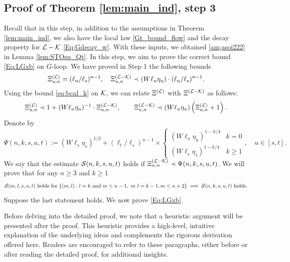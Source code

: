 \documentclass[10pt,reqno]{article}
\theoremstyle{plain} %
\theoremstyle{remark}
\numberwithin{equation}{section}
\begin{document}
 \subsection{Proof of Theorem \ref{lem:main_ind}, step 3}
Recall  that in this step, in addition to the assumptions in Theorem \ref{lem:main_ind}, we also have the local law \eqref{Gt_bound_flow} and the decay property for $\cal L-\cal K$ \eqref{Eq:Gdecay_w}. With these inputs, we obtained \eqref{am;asoi222} %
in Lemma \ref{lem:STOeq_Qt}.  In this step,  we aim to prove the correct bound \eqref{Eq:LGxb} on $G$-loop. 
We  have proved in  Step 1 the following bounds 
\begin{align}\label{sef8w483r324}
  \Xi^{(\cal L)}_{u,n}=(\ell_u/\ell_s)^{n-1}, \quad 
 \Xi^{({\cal L-K})}_{u, n}\prec (W\ell_u\eta_u)\cdot (\ell_u/\ell_s)^{n-1} .
\end{align}
Using  the bound \eqref{eq:bcal_k} on $\cal K$, we can relate $\Xi^{(\cal L)}$ with $\Xi^{(\cal L-\cal K)}$ as follows:
\begin{align}\label{rela_XILXILK}
    \Xi^{(\cal L)}_{u,n}\prec 1+(W\ell_u\eta_u)^{-1}\cdot \Xi^{({\cal L-\cal K})}_{u, n},\quad \quad \Xi^{({\cal L-\cal K})}_{u, n}
\prec (W\ell_u\eta_u) \left(\Xi^{(\cal L)}_{u,n}+1\right).
\end{align}
Denote by 
\begin{equation}\label{adsyzz0s8d6}
      \Psi(n,k,s,u,t):=  (W\ell_s\eta_s)^{1/2}+(\ell_t/\ell_s)^{n-1}\times
    \begin{cases}
        (W\ell_u\eta_u)^{1-k/4} &  k=0\\
        (W\ell_s\eta_s)^{1-k/4} &  k\ge 1 
    \end{cases},\quad u\in [s,t] .
\end{equation}
We say that the estimate $ {\cal S}(n,k,s,u,t)$ holds if $\Xi^{({\cal L-K})}_{ u,n}\prec   \Psi(n,k,s,u,t)$.
We will prove that for any $n \ge 3$ and $k \ge 1$ %
\begin{align}\label{St3MnAsm} 
{\cal S}(m, l,s,u,t)  \text{ holds for }  \{(m, l) : l=k \text{ and }  m \le n-1, \text{ or } l=k-1,   m \le n+2 \}  
\implies 
{\cal S}(n,k,s,u,t)  \text{ holds}.
\end{align} 
Suppose the last statement  holds. We now prove  \eqref{Eq:LGxb}. 

Before delving into the detailed proof, we note that a heuristic argument will be presented  after the proof. This heuristic provides a high-level, intuitive explanation of the underlying ideas and complements the rigorous derivation offered here. Readers are encouraged to refer to these paragraphs, either before or after reading the detailed proof, for additional insights. 
\end{document}
